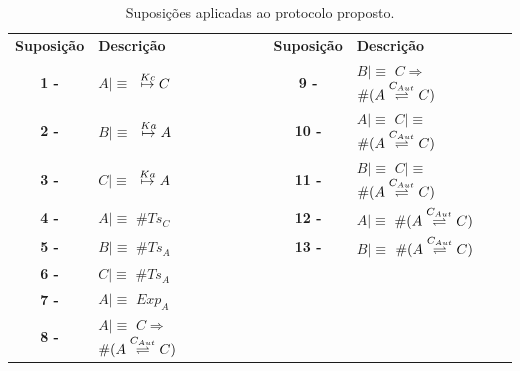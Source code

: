 \begin{table}[h]
\begin{tabular}{cllcl}
\textbf{Suposição} & \textbf{Descrição} &  & \textbf{Suposição} & \textbf{Descrição} \\
\textbf{1 -}       & $ A \mid\equiv$  ${{}\stackrel{Kc}{\mapsto}{C}}$                 &  & \textbf{9 -}       & $ B \mid\equiv$ $ C \Rightarrow $ $\#({A}\stackrel{{C_{Aut}}}{\rightleftharpoons}{C})$ \\
\textbf{2 -}       & $ B \mid\equiv$  ${{}\stackrel{Ka}{\mapsto}{A}}$                 &  & \textbf{10 -}      & $ A \mid\equiv$ $ C \mid\equiv $ $\#({A}\stackrel{{C_{Aut}}}{\rightleftharpoons}{C})$ \\
\textbf{3 -}       & $ C \mid\equiv$  ${{}\stackrel{Ka}{\mapsto}{A}}$                 &  & \textbf{11 -}      & $ B \mid\equiv$ $ C \mid\equiv $ $\#({A}\stackrel{{C_{Aut}}}{\rightleftharpoons}{C})$ \\

\textbf{4 -}       & $ A \mid\equiv$  $\#{Ts_C}$                         &  & \textbf{12 -}      & $ A \mid\equiv$  $\#({A}\stackrel{{C_{Aut}}}{\rightleftharpoons}{C})$  \\

\textbf{5 -}       & $ B \mid\equiv$  $\#{Ts_A}$                         &  & \textbf{13 - }      & $ B \mid\equiv$  $\#({A}\stackrel{{C_{Aut}}}{\rightleftharpoons}{C})$  \\

\textbf{6 -}       & $ C \mid\equiv$  $\#{Ts_A}$                         &  & \textbf{ }                    &                                      \\
\textbf{7 -}       & $ A \mid\equiv$  ${Exp_A}$                          &  & \textbf{ }                   &
\\
\textbf{8 -}       & $ A \mid\equiv$  $ C \Rightarrow $ $\#({A}\stackrel{{C_{Aut}}}{\rightleftharpoons}{C})$   &   & \textbf{ }     &                               \\
\end{tabular}
\caption {Suposições aplicadas ao protocolo proposto.}
\label{tab:suposicoesBAN}
\end{table}


